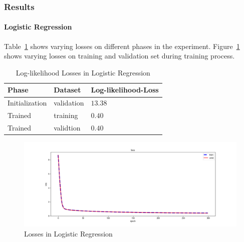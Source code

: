 \documentclass[journal, a4paper]{IEEEtran}
\begin{document}
\subsubsection{Results}
\paragraph{Logistic Regression}
    Table~\ref{tab:logistic-losses} shows varying losses on different phases in the experiment. Figure~\ref{fig:logistic-losses} shows varying losses on training and validation set during training process.

    \begin{table}[!hbt]
        \begin{center}
        \caption{Log-likelihood Losses in Logistic Regression}
        \label{tab:logistic-losses}
        \begin{tabular}{l|l|l}
            \hline
            Phase & Dataset & Log-likelihood-Loss \\
            \hline
            Initialization & validation & $13.38$ \\
            Trained & training & $0.40$ \\
            Trained & validtion & $0.40$ \\
            \hline
        \end{tabular}
        \end{center}
    \end{table}   
     
    \begin{figure}[!hbt]
        \begin{center}
        \caption{Losses in Logistic Regression}
        \label{fig:logistic-losses}
        \includegraphics[width=\columnwidth]{../images/logistics-regression-losses.png}
        \end{center}
    \end{figure}
    
\end{document}
